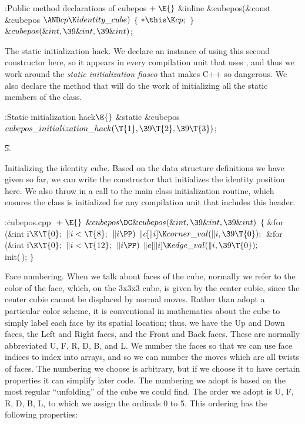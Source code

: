 \Y\B\4:Public method declarations of cubepos\X${}\mathrel+\E{}$\6
\&{inline} \&{cubepos}(\&{const} \&{cubepos} ${}{\AND}\\{cp}\K\\{identity%
\_cube}){}$\1\1\2\2\6
${}\{{}$\1\6
${}{*}\this\K\\{cp};{}$\6
\4${}\}{}$\2\7
${}\&{cubepos}(\&{int},\39\&{int},\39\&{int}){}$;\par
\fi

The static initialization hack.
We declare an instance of  using this second constructor
here, so it appears in every compilation unit that uses , and
thus we work around the {\it static initialization fiasco} that makes
C++ so dangerous.  We also declare the method that will do the work of
initializing all the static members of the class.

\Y\B\4:Static initialization hack\X${}\E{}$\6
\&{static} \&{cubepos} ${}\\{cubepos\_initialization\_hack}(\T{1},\39\T{2},\39%
\T{3}){}$;\par
\U5.\fi

Initializing the identity cube.
Based on the data structure definitions we have given so far, we can
write the constructor that initializes the identity position here.  We
also throw in a call to the main class initialization routine, which
ensures the class is initialized for any compilation unit that
includes this header.

\Y\B\4:\.{cubepos.cpp }\X${}\mathrel+\E{}$\6
$\&{cubepos}\DC\&{cubepos}(\&{int},\39\&{int},\39\&{int}){}$\1\1\2\2\6
${}\{{}$\1\6
\&{for} (\&{int} \|i${}\K\T{0};{}$ ${}\|i<\T{8};{}$ ${}\|i\PP){}$\1\5
${}\|c[\|i]\K\\{corner\_val}(\|i,\39\T{0});{}$\2\6
\&{for} (\&{int} \|i${}\K\T{0};{}$ ${}\|i<\T{12};{}$ ${}\|i\PP){}$\1\5
${}\|e[\|i]\K\\{edge\_val}(\|i,\39\T{0});{}$\2\6
\\{init}(\,);\6
\4${}\}{}$\2\par
\fi

Face numbering.
When we talk about faces of the cube, normally we refer to the color
of the face, which, on the 3x3x3 cube, is given by the center cubie,
since the center cubie cannot be displaced by normal moves.  Rather
than adopt a particular color scheme, it is conventional in
mathematics about the cube to simply label each face by its spatial
location; thus, we have the Up and Down faces, the Left and Right
faces, and the Front and Back faces.  These are normally abbreviated
U, F, R, D, B, and L.  We number the faces so that we can use face
indices to index into arrays, and so we can number the moves which are
all twists of faces.  The numbering we choose is arbitrary, but if we
choose it to have certain properties it can simplify later code.  The
numbering we adopt is based on the most regular ``unfolding'' of the
cube we could find.  The order we adopt is U, F, R, D, B, L, to which
we assign the ordinals 0 to 5.  This ordering has the following
properties:

